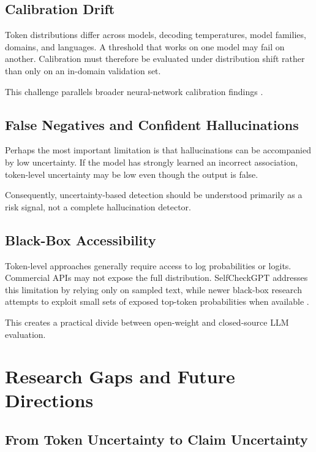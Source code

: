 \documentclass[11pt]{article}
\begin{document}
\subsection{Calibration Drift}
\label{sec:calibration-drift}

Token distributions differ across models, decoding temperatures, model families, domains, and languages. A threshold that works on one model may fail on another. Calibration must therefore be evaluated under distribution shift rather than only on an in-domain validation set.

This challenge parallels broader neural-network calibration findings \cite{guo2017}.

\subsection{False Negatives and Confident Hallucinations}
\label{sec:false-negatives}

Perhaps the most important limitation is that hallucinations can be accompanied by low uncertainty. If the model has strongly learned an incorrect association, token-level uncertainty may be low even though the output is false.

Consequently, uncertainty-based detection should be understood primarily as a risk signal, not a complete hallucination detector.

\subsection{Black-Box Accessibility}
\label{sec:black-box}

Token-level approaches generally require access to log probabilities or logits. Commercial APIs may not expose the full distribution. SelfCheckGPT addresses this limitation by relying only on sampled text, while newer black-box research attempts to exploit small sets of exposed top-token probabilities when available \cite{manakul2023}.

This creates a practical divide between open-weight and closed-source LLM evaluation.

\section{Research Gaps and Future Directions}
\label{sec:future}

\subsection{From Token Uncertainty to Claim Uncertainty}
\label{sec:claim-uncertainty}
\end{document}
